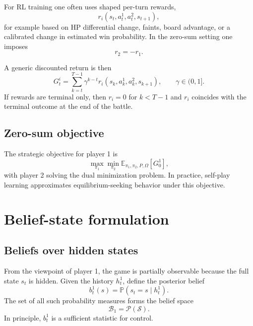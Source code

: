 \documentclass[aps,pre,twocolumn,superscriptaddress,nofootinbib]{revtex4-2}
\newcommand{\cS}{\mathcal{S}}
\newcommand{\cB}{\mathcal{B}}
\newcommand{\cP}{\mathcal{P}}
\newcommand{\EE}{\mathbb{E}}
\newcommand{\PP}{\mathbb{P}}
\theoremstyle{definition}
\theoremstyle{plain}
\begin{document}
For RL training one often uses shaped per-turn rewards,
\begin{equation}
    r_i(s_t,a_t^1,a_t^2,s_{t+1}),
\end{equation}
for example based on HP differential change, faints, board advantage, or a calibrated change in estimated win probability. In the zero-sum setting one imposes
\begin{equation}
    r_2 = -r_1.
\end{equation}

A generic discounted return is then
\begin{equation}
    G_t^i = \sum_{k=t}^{T-1} \gamma^{k-t} r_i(s_k,a_k^1,a_k^2,s_{k+1}),
    \qquad \gamma \in (0,1].
\end{equation}
If rewards are terminal only, then $r_i=0$ for $k<T-1$ and $r_i$ coincides with the terminal outcome at the end of the battle.

\subsection{Zero-sum objective}

The strategic objective for player 1 is
\begin{equation}
    \max_{\pi_1}\min_{\pi_2}
    \EE_{\pi_1,\pi_2,P,\Omega}[G_0^1],
    \label{eq:minimax_obj}
\end{equation}
with player 2 solving the dual minimization problem. In practice, self-play learning approximates equilibrium-seeking behavior under this objective.

\section{Belief-state formulation}
\label{sec:beliefs}

\subsection{Beliefs over hidden states}

From the viewpoint of player 1, the game is partially observable because the full state $s_t$ is hidden. Given the history $h_t^1$, define the posterior belief
\begin{equation}
    b_t^1(s) = \PP(s_t=s \mid h_t^1).
\end{equation}
The set of all such probability measures forms the belief space
\begin{equation}
    \cB_1 = \cP(\cS).
\end{equation}
In principle, $b_t^1$ is a sufficient statistic for control.
\end{document}
